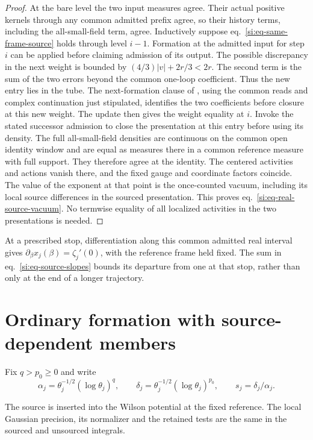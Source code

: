 \documentclass[11pt,letterpaper,reqno]{amsart}
\numberwithin{equation}{section}
\renewcommand{\eqref}[1]{\textup{eq.~\ref{#1}}}
\theoremstyle{definition}
\theoremstyle{remark}
\begin{document}
\begin{proof}
At the bare level the two input measures agree. Their actual
positive kernels through any common admitted prefix agree, so their
history terms, including the all-small-field term, agree. Inductively
suppose \eqref{si:eq-same-frame-source} holds through level $i-1$.
Formation at the admitted input for step $i$ can be applied before
claiming admission of its output. The possible discrepancy in the
next weight is bounded by $(4/3)|v|+2r/3<2r$. The second term is the
sum of the two errors beyond the common one-loop coefficient. Thus
the new entry lies in the tube. The next-formation clause of
\cite[Proposition~7.1]{RT}, using the common reads and complex
continuation just stipulated, identifies the two coefficients
before closure at this new weight.
The update then gives the weight equality at $i$. Invoke the
stated successor admission to close the presentation at this
entry before using its density. The full
all-small-field densities are continuous on the common open
identity window and are equal as measures there in a common
reference measure with full support. They therefore agree at the
identity. The centered activities and actions vanish there, and
the fixed gauge and coordinate factors coincide. The value of the
exponent at that point is the once-counted vacuum, including its
local source differences in the sourced presentation. This proves
\eqref{si:eq-real-source-vacuum}. No termwise equality of all
localized activities in the two presentations is needed.
\end{proof}

At a prescribed stop, differentiation along this common admitted
real interval gives $\partial_\beta x_j(\beta)=\zeta_j'(0)$,
with the reference frame held fixed. The sum in
\eqref{si:eq-source-slopes} bounds its departure from one at that
stop, rather than only at the end of a longer trajectory.


\section{Ordinary formation with source-dependent members}
\label{si:sec-member-formation}

Fix $q>p_0\ge0$ and write
\[
 \alpha_j=\theta_j^{-1/2}(\log\theta_j)^q,
 \qquad \delta_j=\theta_j^{-1/2}(\log\theta_j)^{p_0},
 \qquad s_j=\delta_j/\alpha_j.
\]

The source is inserted into the Wilson potential at the fixed
reference. The local Gaussian precision, its normalizer and the
retained tests are the same in the sourced and unsourced integrals.
\end{document}

